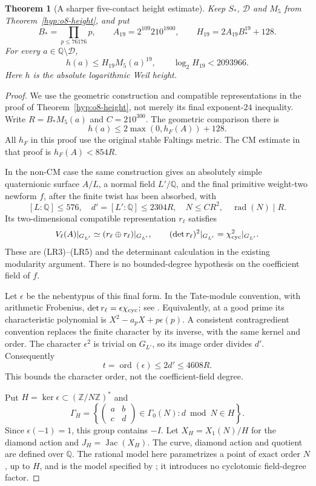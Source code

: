\documentclass[11pt]{article}
\newtheorem{theorem}{Theorem}[section]
\theoremstyle{definition}
\theoremstyle{remark}
\begin{document}
\begin{theorem}[A sharper five-contact height estimate]\label{thm:quartic-height19}
Keep $S_*$, $\mathcal D$ and $M_5$ from Theorem~\ref{hyp:o8-height}, and put
\[
 B_*=\prod_{p\le76176}p,\qquad
 A_{19}=2^{109}210^{1800},\qquad H_{19}=2A_{19}B_*^{19}+128.
\]
For every $a\in\mathbb Q\setminus\mathcal D$,
\[
 h(a)\le H_{19}M_5(a)^{19},
 \qquad \log_2H_{19}<2093966.
\]
Here $h$ is the absolute logarithmic Weil height.
\end{theorem}
\begin{proof}
We use the geometric construction and compatible representations in the
proof of Theorem~\ref{hyp:o8-height}, not merely its final exponent-$24$
inequality. Write $R=B_*M_5(a)$ and $C=210^{300}$.
The geometric comparison there is
\[
 h(a)\le2\max(0,h_F(A))+128.
\]
All $h_F$ in this proof use the original stable Faltings metric.
The CM estimate in that proof is $h_F(A)<854R$.

In the non-CM case the same construction gives an absolutely simple
quaternionic surface $A/L$, a normal field $L'/\mathbb Q$, and the final
primitive weight-two newform $f$, after the finite twist has been
absorbed, with
\[
 [L:\mathbb Q]\le576,\quad d'=[L':\mathbb Q]\le2304R,\quad
 N\le CR^2,\quad \operatorname{rad}(N)\mid R.
\]
Its two-dimensional compatible representation $r_\ell$ satisfies
\[
 V_\ell(A)|_{G_{L'}}\simeq
       (r_\ell\oplus r_\ell)|_{G_{L'}},\qquad
 (\det r_\ell)^2|_{G_{L'}}=\chi_{\rm cyc}^2|_{G_{L'}}.
\]
These are (LR3)--(LR5) and the determinant calculation in the existing
modularity argument. There is no bounded-degree hypothesis on the
coefficient field of $f$.

Let $\epsilon$ be the nebentypus of this final form. In the Tate-module
convention, with arithmetic Frobenius, $\det r_\ell=\epsilon\chi_{\rm cyc}$;
see \cite[\S12.5, (12.5.1)--(12.5.2) and Remark 12.5.1,
pp.~119--120]{diamond-im}. Equivalently, at a good prime its
characteristic polynomial is $X^2-a_pX+p\epsilon(p)$.
A consistent contragredient convention replaces the finite character by
its inverse, with the same kernel and order. The character $\epsilon^2$
is trivial on $G_{L'}$, so its image order divides $d'$. Consequently
\[
 t=\operatorname{ord}(\epsilon)\le2d'\le4608R.
\]
This bounds the character order, not the coefficient-field degree.

Put $H=\ker\epsilon\subset(\mathbb Z/N\mathbb Z)^*$ and
\[
 \Gamma_H=\left\{
 \begin{pmatrix}a&b\\c&d\end{pmatrix}\in\Gamma_0(N):
 d\bmod N\in H\right\}.
\]
Since $\epsilon(-1)=1$, this group contains $-I$.
Let $X_H=X_1(N)/H$ for the diamond action and $J_H=\operatorname{Jac}(X_H)$.
The curve, diamond action and quotient are defined over $\mathbb Q$.
The rational model here parametrizes a point of exact order $N$, up to
$H$, and is the model specified by \cite[\S2.1, (2.1.8)]{mascot-moduli};
it introduces no cyclotomic field-degree factor.


\end{proof}
\end{document}
